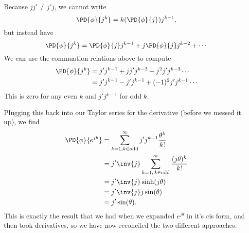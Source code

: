 {Because \( j j' \ne j' j \), we cannot write
\begin{equation}\label{eqn:dexpquestion:n}
\PD{\phi}{j^k} = k (\PD{\phi}{j}) j^{k-1},
\end{equation}
but instead have
\begin{equation}\label{eqn:dexpquestion:100}
\PD{\phi}{j^k} = \PD{\phi}{j} j^{k-1} + j \PD{\phi}{j} j^{k-2} + \cdots
\end{equation}
We can use the commuation relations above to compute
\begin{equation}\label{eqn:dexpquestion:260}
\begin{aligned}
\PD{\phi}{j^k}
&= j' j^{k-1} + j j' j^{k-2} + j^2 j' j^{k-3} \cdots \\
&= j' j^{k-1} - j' j^{k-1} + (-1)^2 j' j^{k-1} \cdots
\end{aligned}
\end{equation}
This is zero for any even \( k \) and \( j' j^{k-1} \) for odd \( k \).

Plugging this back into our Taylor series for the derivative (before we messed it up), we find
\begin{equation}\label{eqn:dexpquestion:280}
\begin{aligned}
\PD{\phi}{e^{j\theta}}
&= \sum_{k = 1, k \in \mathrm{odd}}^\infty j' j^{k-1} \frac{ \theta^k }{k!} \\
&= j' \inv{j}
\sum_{k = 1,\, k \in \mathrm{odd}}^\infty \frac{ (j\theta)^k }{k!} \\
&= j' \inv{j} \sinh( j \theta ) \\
&= j' \inv{j} j \sin( \theta ) \\
&= j' \sin( \theta ).
\end{aligned}
\end{equation}
This is exactly the result that we had when we expanded \( e^{j\theta} \) in it's cis form, and then took derivatives, so we have now reconciled the two different approaches.
} %
